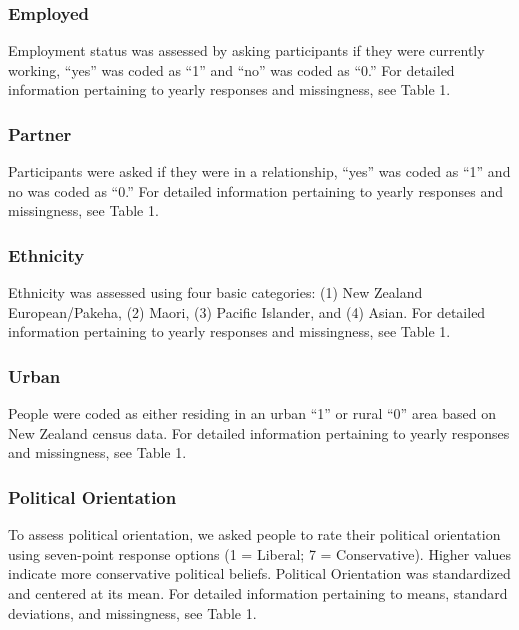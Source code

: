 \documentclass[
  english,
  man]{apa6}
\begin{document}
\hypertarget{employed}{%
\subsubsection{Employed}\label{employed}}

Employment status was assessed by asking participants if they were currently working, \enquote{yes} was coded as \enquote{1} and \enquote{no} was coded as \enquote{0.} For detailed information pertaining to yearly responses and missingness, see Table 1.

\hypertarget{partner}{%
\subsubsection{Partner}\label{partner}}

Participants were asked if they were in a relationship, \enquote{yes} was coded as \enquote{1} and no was coded as \enquote{0.} For detailed information pertaining to yearly responses and missingness, see Table 1.

\hypertarget{ethnicity}{%
\subsubsection{Ethnicity}\label{ethnicity}}

Ethnicity was assessed using four basic categories: (1) New Zealand European/Pakeha, (2) Maori, (3) Pacific Islander, and (4) Asian. For detailed information pertaining to yearly responses and missingness, see Table 1.

\hypertarget{urban}{%
\subsubsection{Urban}\label{urban}}

People were coded as either residing in an urban \enquote{1} or rural \enquote{0} area based on New Zealand census data. For detailed information pertaining to yearly responses and missingness, see Table 1.

\hypertarget{political-orientation}{%
\subsubsection{Political Orientation}\label{political-orientation}}

To assess political orientation, we asked people to rate their political orientation using seven-point response options (1 = Liberal; 7 = Conservative). Higher values indicate more conservative political beliefs. Political Orientation was standardized and centered at its mean. For detailed information pertaining to means, standard deviations, and missingness, see Table 1.
\end{document}
